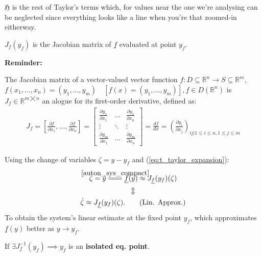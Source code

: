 $\mathfrak{H}$ is the rest of Taylor's terms which, for values near the one we're analysing can be neglected since everything looks like a line when you're that zoomed-in eitherway.

$J_{\underline{f}}(y_f)$ is the Jacobian matrix of $\underline{f}$ evaluated at point $y_f$.

\textbf{Reminder:}
\begin{definition}
The Jacobian matrix of a vector-valued vector function $f : D \subseteq \mathbb{R}^n \rightarrow S \subseteq \mathbb{R}^m$, $f(x_1, \dots, x_n) = (y_1, \dots , y_m) \quad [f(x) = (y_1, \dots , y_m)], f \in D(\mathbb{R}^n)$ is $J_f \in \mathbb{R}^{m \bigtimes n}$ an alogue for its first-order derivative, defined as:
\begin{align*}
  J_f = \left[ \frac{\partial f}{\partial x_1}, \dots , \frac{\partial f}{\partial x_n}  \right] =
  \begin{bmatrix*}
    \frac{\partial y_1}{\partial x_1} & \dots & \frac{\partial y_1}{\partial x_n} \\
    \vdots & \ddots & \vdots \\
    \frac{\partial y_m}{\partial x_1} & \dots &  \frac{\partial y_m}{\partial x_n}
  \end{bmatrix*} =
  \frac{df}{dx} =
  \left(   \frac{\partial y_i}{\partial x_j} \right)_{ij | 1 \leqslant i \leqslant n, 1 \leqslant j \leqslant m}
\end{align*}
\end{definition}

\newcommand\eqCuzOfSys{\stackrel{\mathclap{\normalfont\mbox{\ref{auton_sys_compact}}}}{=\joinrel=\joinrel=}}

Using the change of variables $\zeta = y - y_f$ and (\ref{eq:t_taylor_expansion}):
\begin{gather} \label{eq:lin_approx}
\dot{\zeta} = \dot{y} \eqCuzOfSys \underline{f}(y) \approx J_{\underline{f}}(y_f)(\zeta)  \notag \\
\Updownarrow \notag \\
\dot{\zeta} \approx J_{\underline{f}}(y_f)(\zeta). \tag{Lin. Approx.}
\end{gather}
To obtain the system's linear estimate at the fixed point $y_f$, which approximates $\underline{f}(y)$ better as $y \rightarrow y_f$.

\begin{theorem}
If $\exists J_{\underline{f}}^{-1}(y_f) \implies y_f$ is an \textbf{isolated eq. point}.
\end{theorem}

